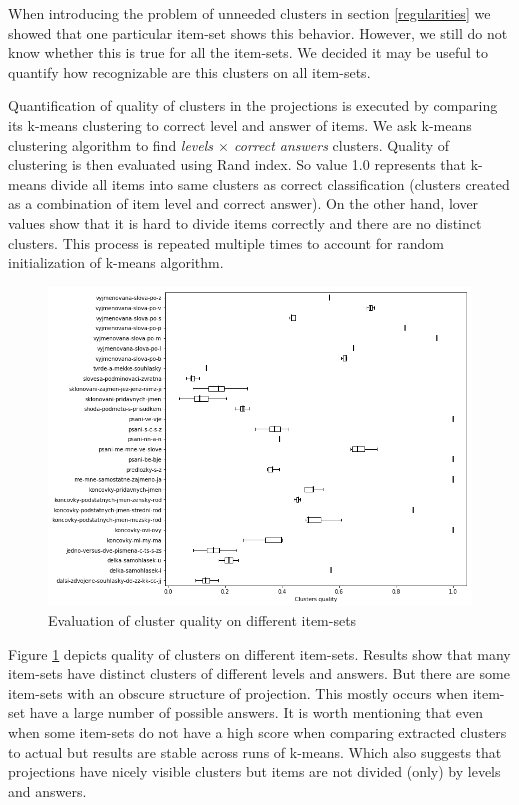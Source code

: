 \documentclass[
  digital, %
  table,   %
  nolof,     %
  nolot,     %
  nocover,
  color,
  final, %
]{fithesis3}
\begin{document}
When introducing the problem of unneeded clusters in section \ref{regularities} we showed that one particular item-set shows this behavior. However, we still do not know whether this is true for all the item-sets. We decided it may be useful to quantify how recognizable are this clusters on all item-sets.


Quantification of quality of clusters in the projections is executed by comparing its k-means clustering to correct level and answer of items. We ask k-means clustering algorithm to find \textit{levels $\times$ correct answers} clusters. Quality of clustering is then evaluated using Rand index. So value 1.0 represents that k-means divide all items into same clusters as correct classification (clusters created as a combination of item level and correct answer). On the other hand, lover values show that it is hard to divide items correctly and there are no distinct clusters. This process is repeated multiple times to account for random initialization of k-means algorithm.

\begin{figure}
  \includegraphics[width=\textwidth]{img/clustering_quality}
  \caption{Evaluation of cluster quality on different item-sets}
  \label{fig:clustering_quality}
\end{figure}

Figure \ref{fig:clustering_quality} depicts quality of clusters on different item-sets. Results show that many item-sets have distinct clusters of different levels and answers. But there are some item-sets with an obscure structure of projection. This mostly occurs when item-set have a large number of possible answers. It is worth mentioning that even when some item-sets do not have a high score when comparing extracted clusters to actual but results are stable across runs of k-means. Which also suggests that projections have nicely visible clusters but items are not divided (only) by levels and answers.
\end{document}
